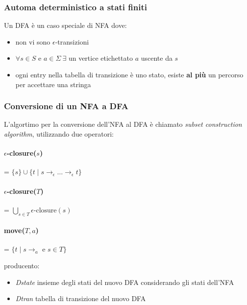 \subsubsection{Automa deterministico a stati finiti}
Un DFA è un caso speciale di NFA dove:
\begin{itemize}
\item non vi sono $\epsilon$-transizioni
\item $\forall s \in S \text{ e } a \in \Sigma \ \exists$ un vertice etichettato
$a$ uscente da $s$
\item ogni entry nella tabella di transizione è uno stato, esiste
\textbf{al più} un percorso per accettare una stringa
\end{itemize}

\subsubsection{Conversione di un NFA a DFA}
\label{sec:NFA_to_DFA}
L'algortimo per la conversione dell'NFA al DFA è chiamato
\textit{subset construction algorithm}, utilizzando due operatori:

\paragraph{$\epsilon$-closure($s$)} = $\{s\} \cup \{t \mid s \to_\epsilon \dots
\to_\epsilon t\}$
\paragraph{$\epsilon$-closure($T$)} = $\bigcup_{s \in T}
\epsilon\text{-closure}(s)$
\paragraph{move($T,a$)} = $\{t \mid s \to_a \text{ e } s \in T\}$

\bigskip

producento:
\begin{itemize}
\item \textit{Dstate} insieme degli stati del nuovo DFA considerando gli stati
dell'NFA
\item \textit{Dtran} tabella di transizione del nuovo DFA
\end{itemize}

